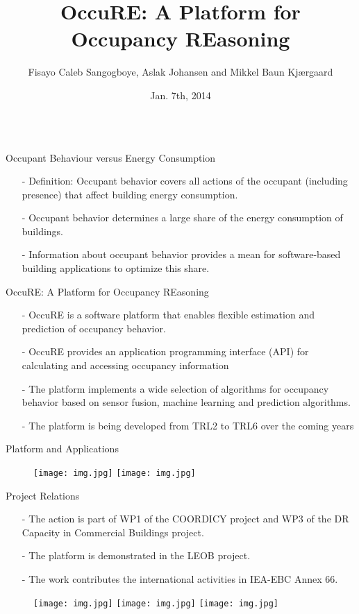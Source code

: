 \documentclass[final,hyperref={pdfpagelabels=false},11pt]{beamer}
\title{OccuRE: A Platform for Occupancy REasoning}
\author{Fisayo Caleb Sangogboye, Aslak Johansen and Mikkel Baun Kjærgaard}
\institute[University of Southern Denmark]{Centre for Smart Energy Solutions\\ The Maersk Mc-Kinney Moller Institute\\ University of Southern Denmark\\ Odense, Denmark}
\date[Jan. 7th, 2014]{Jan. 7th, 2014}
\begin{document}
\begin{frame}[t]
\begin{columns}[T]
\begin{column}{0.88\paperwidth}
\begin{block}{Occupant Behaviour versus Energy Consumption}
\begin{itemize}
  \item[-] Definition: Occupant behavior covers all actions of the occupant (including presence) that affect building energy consumption.
  \item[-] Occupant behavior determines a large share of the energy consumption of buildings.
  \item[-] Information about occupant behavior provides a mean for software-based building applications to optimize this share.
\end{itemize}
\end{block}
\begin{block}{OccuRE: A Platform for Occupancy REasoning}
\begin{itemize}
  \item[-] OccuRE is a software platform that enables flexible estimation and prediction of occupancy behavior.
  \item[-] OccuRE provides an application programming interface (API) for calculating and accessing occupancy information
  \item[-] The platform implements a wide selection of algorithms for occupancy behavior based on sensor fusion, machine learning and prediction algorithms.
  \item[-] The platform is being developed from TRL2 to TRL6 over the coming years
\end{itemize}
\end{block}
\begin{block}{Platform and Applications}
\begin{figure}
\centering
\texttt{[image: img.jpg]}
\texttt{[image: img.jpg]}
\end{figure}
\end{block}
\begin{block}{Project Relations}
\begin{itemize}
  \item[-] The action is part of WP1 of the COORDICY project and WP3 of the DR Capacity in Commercial Buildings project.
  \item[-] The platform is demonstrated in the LEOB project.
  \item[-] The work contributes the international activities in IEA-EBC Annex 66.
\end{itemize}
\begin{figure}
\centering
\texttt{[image: img.jpg]}
\texttt{[image: img.jpg]}
\texttt{[image: img.jpg]}
\end{figure}
\end{block}



\end{column}
\end{columns}
\end{frame}
\end{document}
